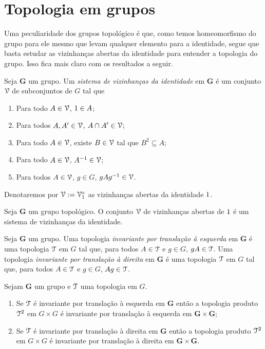 \section{Topologia em grupos}

Uma peculiaridade dos grupos topológico é que, como temos homeomorfismo do grupo para ele mesmo que levam qualquer elemento para a identidade, segue que basta estudar as vizinhanças abertas da identidade para entender a topologia do grupo. Isso fica mais claro com os resultados a seguir.

\begin{definition}
Seja $\bm G$ um grupo. Um \emph{sistema de vizinhanças da identidade} em $\bm G$ é um conjunto $\mathcal{V}$ de subconjuntos de $G$ tal que
	\begin{enumerate}
	\item Para todo $A \in \mathcal{V}$, $1 \in A$;
	\item Para todos $A,A' \in \mathcal{V}$, $A \cap A' \in \mathcal{V}$;
	\item Para todo $A \in \mathcal{V}$, existe $B \in \mathcal{V}$ tal que $B^2 \subseteq A$;
	\item	 Para todo $A \in \mathcal{V}$, $A^{-1} \in \mathcal{V}$;
	\item Para todos $A \in \mathcal{V}$, $g \in G$, $gAg^{-1} \in \mathcal{V}$.	
	\end{enumerate}
\end{definition}

Denotaremos por $\mathcal{V} := \mathcal{V}_1^\circ$ as vizinhanças abertas da identidade $1$.

\begin{proposition}
Seja $\bm G$ um grupo topológico. O conjunto $\mathcal{V}$ de vizinhanças abertas de $1$ é um sistema de vizinhanças da identidade.
\end{proposition}

\begin{definition}
Seja $\bm G$ um grupo. Uma topologia \emph{invariante por translação à esquerda} em $\bm G$ é uma topologia $\mathcal{T}$ em $G$ tal que, para todos $A \in \mathcal{T}$ e $g \in G$, $gA \in \mathcal{T}$. Uma topologia \emph{invariante por translação à direita} em $\bm G$ é uma topologia $\mathcal{T}$ em $G$ tal que, para todos $A \in \mathcal{T}$ e $g \in G$, $Ag \in \mathcal{T}$.
\end{definition}

\begin{proposition}
Sejam $\bm G$ um grupo e $\mathcal{T}$ uma topologia em $G$.
	\begin{enumerate}
	\item Se $\mathcal{T}$ é invariante por translação à esquerda em $\bm G$ então a topologia produto $\mathcal{T}^2$ em $G \times G$ é invariante por translação à esquerda em $\bm G \times \bm G$;
	\item Se $\mathcal{T}$ é invariante por translação à direita em $\bm G$ então a topologia produto $\mathcal{T}^2$ em $G \times G$ é invariante por translação à direita em $\bm G \times \bm G$.
	\end{enumerate}
\end{proposition}

